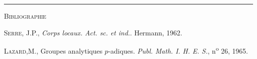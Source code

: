 \documentclass[12pt,reqno]{amsart}
\begin{document}
\vspace{1.2em}
\begin{center}
\rule{4cm}{0.4pt}
\end{center}
\vspace{0.5em}

\begin{center}
\textsc{Bibliographie}
\end{center}

\begin{list}{}{\setlength{\leftmargin}{2.5em}\setlength{\labelwidth}{2em}\setlength{\labelsep}{0.5em}\setlength{\itemsep}{0pt}}
\item[{[1]}] \textsc{Serre, J.P.}, \emph{Corps locaux. Act. sc. et ind.}. Hermann, 1962.
\item[{[2]}] \textsc{Lazard,M.}, Groupes analytiques $p$-adiques. \emph{Publ. Math. I. H. E. S.}, n\textsuperscript{o} 26, 1965.
\end{list}
\end{document}
